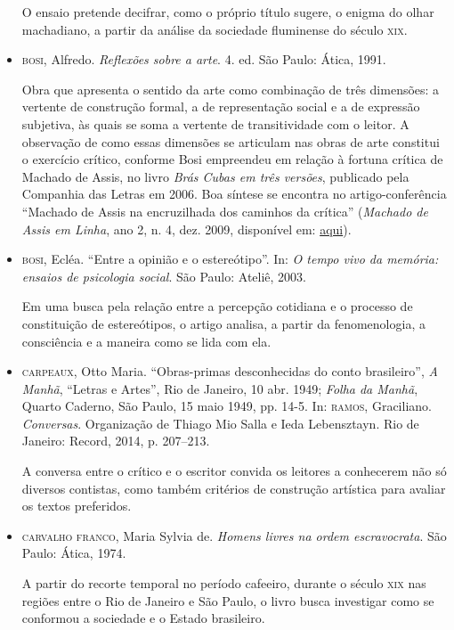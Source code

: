 \documentclass[11pt]{extarticle}
\begin{document}
\begin{itemize}
O ensaio pretende decifrar, como o próprio título sugere, o enigma do olhar machadiano, 
a partir da análise da sociedade fluminense do século \textsc{xix}.

\item  \textsc{bosi}, Alfredo. \emph{Reflexões sobre a arte}. 4. ed. São Paulo: Ática,
1991. 

Obra que apresenta o sentido da arte como combinação de três
dimensões: a vertente de construção formal, a de representação social e
a de expressão subjetiva, às quais se soma a vertente de transitividade
com o leitor. A observação de como essas dimensões se articulam nas
obras de arte constitui o exercício crítico, conforme Bosi empreendeu em
relação à fortuna crítica de Machado de Assis, no livro \emph{Brás Cubas
em três versões}, publicado pela Companhia das Letras em 2006. Boa
síntese se encontra no artigo-conferência ``Machado de Assis na
encruzilhada dos caminhos da crítica'' (\emph{Machado de Assis em
Linha}, ano 2, n. 4, dez. 2009, disponível em:
\href{http://machadodeassis.net/download/numero04/num04artigo02.pdf}{aqui}).

\item  \textsc{bosi}, Ecléa. ``Entre a opinião e o estereótipo''. In: \emph{O tempo vivo da
memória: ensaios de psicologia social}. São Paulo: Ateliê, 2003.

Em uma busca pela relação entre a percepção cotidiana e o processo de constituição de 
estereótipos, o artigo analisa, a partir da fenomenologia, a consciência e a maneira 
como se lida com ela.

\item  \textsc{carpeaux}, Otto Maria. ``Obras-primas desconhecidas do conto
brasileiro'', \emph{A Manhã}, ``Letras e Artes'', Rio de Janeiro, 10
abr. 1949; \emph{Folha da Manhã}, Quarto Caderno, São Paulo, 15 maio
1949, pp. 14-5. In: \textsc{ramos}, Graciliano. \emph{Conversas}. Organização de
Thiago Mio Salla e Ieda Lebensztayn. Rio de Janeiro: Record, 2014, p.
207--213. 

A conversa entre o crítico e o escritor convida os leitores a
conhecerem não só diversos contistas, como também critérios de
construção artística para avaliar os textos preferidos.

\item  \textsc{carvalho franco}, Maria Sylvia de. \emph{Homens livres na ordem
escravocrata}. São Paulo: Ática, 1974.

A partir do recorte temporal no período cafeeiro, durante o século \textsc{xix} 
nas regiões entre o Rio de Janeiro e São Paulo, o livro busca investigar como 
se conformou a sociedade e o Estado brasileiro. 


\end{itemize}
\end{document}

